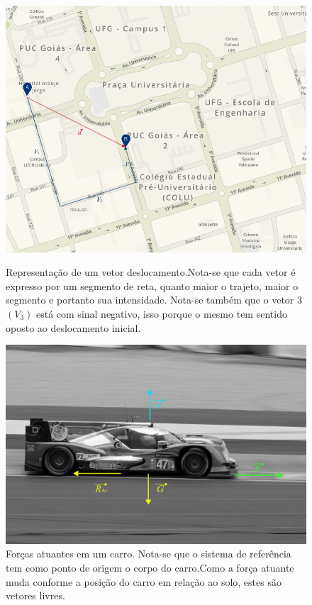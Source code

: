 \documentclass[a4paper, 14pt, twoside]{article}
\begin{document}
\begin{figure}[h]
    \begin{minipage}[t]{0.35\textwidth}
    \vspace{0pt} %
    \centering
    \includegraphics[width=0.9\linewidth]{Figuras/vetordeslocamento.pdf}
    \caption{Representação de um vetor deslocamento.Nota-se que cada vetor é expresso por um segmento de reta, quanto maior o trajeto, maior o segmento e portanto sua intensidade. Nota-se também que o vetor 3 $(V_3)$ está com sinal negativo, isso porque o mesmo tem sentido oposto ao deslocamento inicial.}
    \vspace*{1cm}
    \includegraphics[width=1\linewidth]{Figuras/aviacvet.pdf}
    \caption{Forças atuantes em um carro. Nota-se que o sistema de referência tem como ponto de origem o corpo do carro.Como a força atuante muda conforme a posição do carro em relação ao solo, estes são vetores livres.}
    \end{minipage}%
    \hspace{0.05\textwidth}
    \begin{minipage}[t]{0.60\textwidth}
    \vspace{0pt} %

\end{minipage}
\end{figure}
\end{document}
